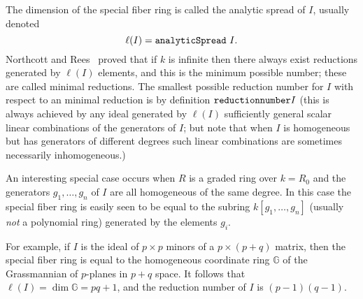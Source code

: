 \documentclass[twoside,12pt, leqno]{amsart}
\begin{document}
The dimension of the special fiber ring is called the analytic spread of $I$, usually
denoted
$$
\ell(I) = {\tt analyticSpread\ }I.
$$
Northcott and Rees~\cite{} proved that if $k$ is infinite then there always exist reductions
generated by $\ell(I)$ elements, and this is the minimum possible number; these are called
minimal reductions. The smallest possible reduction number for $I$ with respect to an minimal reduction is  by definition ${\tt reduction number} I$ (this is always achieved by any ideal generated by $\ell(I)$ sufficiently general scalar linear combinations of the generators of $I$; but note that when $I$ is homogeneous but has generators of different degrees such linear combinations are sometimes necessarily inhomogeneous.)

An interesting special case occurs when $R$ is a graded ring over $k = R_0$ and the generators $g_1,\dots, g_n$ of $I$ are all homogeneous of the same degree. In this case the special fiber ring is easily seen to be equal to the subring $k[g_1,\dots,g_n]$ (usually \emph{not} a polynomial ring) generated by the elements $g_i$.

\def\G{{\mathbb G}}
For example, if $I$ is the ideal of $p\times p$ minors of a $p\times (p+q)$ matrix, then
the special fiber ring is equal to the homogeneous coordinate ring $\G$ of the Grassmannian of
$p$-planes in $p+q$ space. It follows that $\ell(I) = \dim \G = pq+1$, and the reduction number of $I$ is
$(p-1)(q-1)$.
\end{document}
